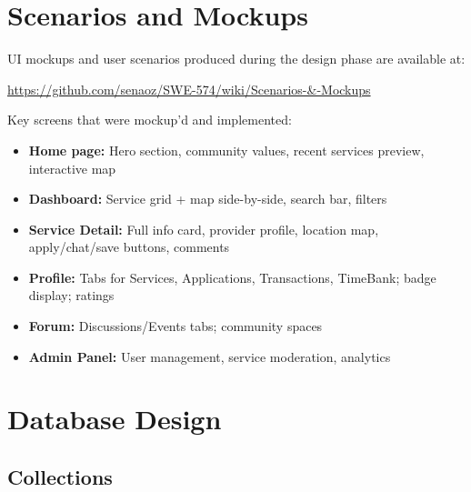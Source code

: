 \documentclass[11pt,a4paper]{report}
\begin{document}
\section{Scenarios and Mockups}

UI mockups and user scenarios produced during the design phase are available at:
\begin{center}
    \url{https://github.com/senaoz/SWE-574/wiki/Scenarios-\&-Mockups}
\end{center}

Key screens that were mockup'd and implemented:
\begin{itemize}
    \item \textbf{Home page:} Hero section, community values, recent services preview, interactive map
    \item \textbf{Dashboard:} Service grid + map side-by-side, search bar, filters
    \item \textbf{Service Detail:} Full info card, provider profile, location map, apply/chat/save buttons, comments
    \item \textbf{Profile:} Tabs for Services, Applications, Transactions, TimeBank; badge display; ratings
    \item \textbf{Forum:} Discussions/Events tabs; community spaces
    \item \textbf{Admin Panel:} User management, service moderation, analytics
\end{itemize}

\section{Database Design}

\subsection{Collections}
\end{document}
